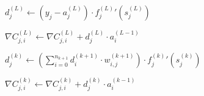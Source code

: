 \documentclass{article}
\begin{document}
      \begin{algorithm}
        \caption{%
          Calculate the gradient with error backpropagation for the given
          expected output ($\mathbf{y} \in \mathbb{R}^{n_L}$), and merge it
          into the gradient of the current batch.
        } \label{algadjustgradient}
        \begin{algorithmic}
              \State $
                d_j^{(L)} \gets
                  \left( y_j - a_j^{(L)} \right)
                  \cdot
                  {f_j^{(L)}}' \left( s_j^{(L)} \right)
              $

                \State $
                  \nabla C_{j,i}^{(L)} \gets
                    \nabla C_{j,i}^{(L)} + d_j^{(L)} \cdot a_i^{(L-1)}
                $
              \EndFor
            \EndFor

                \State $
                  d_j^{(k)} \gets
                    \left(
                      \sum_{i=0}^{n_{k+1}} d_i^{(k+1)} \cdot w_{i,j}^{(k+1)}
                    \right)
                    \cdot
                    {f_j^{(k)}}' \left( s_j^{(k)} \right)
                $

                  \State $
                    \nabla C_{j,i}^{(k)} \gets
                      \nabla C_{j,i}^{(k)} + d_j^{(k)} \cdot a_i^{(k-1)}
                  $
                \EndFor
              \EndFor
            \EndFor
          \EndProcedure
        \end{algorithmic}
      \end{algorithm}
\end{document}
